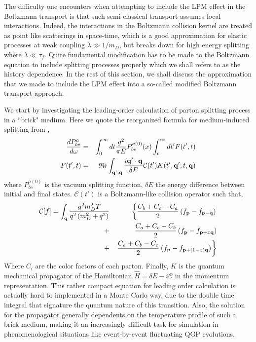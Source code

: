 \documentclass[aps, prc, reprint, amsmath, groupedaddress, nofootinbib]{revtex4-1}
\begin{document}
The difficulty one encounters when attempting to include the LPM effect in the Boltzmann transport is that such semi-classical transport assumes local interactions.
Indeed, the interactions in the Boltzmann collision kernel are treated as point like scatterings in space-time, which is a good approximation for elastic processes at weak coupling $\lambda \gg 1/m_D$, but breaks down for high energy splitting where $\lambda \ll \tau_f$.
Quite fundamental modification has to be made to the Boltzmann equation to include splitting processes properly which we shall refers to as the history dependence.
In the rest of this section, we shall discuss the approximation that we made to include the LPM effect into a so-called modified Boltzmann transport approach.

We start by investigating the leading-order calculation of parton splitting process in a ``brick" medium.
Here we quote the reorganized formula for medium-induced splitting from \cite{CaronHuot:2010bp},
\begin{eqnarray}
\frac{dP^{a}_{bc}}{d\omega} &=& \int_0^\infty dt \frac{g^2}{\pi E} P_{bc}^{a(0)}(x) \int_t^\infty dt'  F(t', t)\label{eq:LO-eq}\\
F(t', t) &=& \mathfrak{Re} \int_{{\bf q}', {\bf q}} \frac{i {\bf q}'\cdot {\bf q}}{\delta E} \mathcal{C}(t') K(t', {\bf q}'; t, {\bf q})
\end{eqnarray}
where $P_{bc}^{a(0)}$ is the vacuum splitting function, $\delta E$ the energy difference between initial and final states. $\mathcal{C}(t')$ is a Boltzmann-like collision operator such that,
\begin{eqnarray}
\mathcal{C}[f] = \int_{\bf q} \frac{g^2 m_D^2 T}{q^2\left(m_D^2+q^2\right)}
&&\left\{  \frac{C_b+C_c-C_a}{2}\left(f_{\bf p}-f_{{\bf p}-{\bf q}}\right) \right.\\\nonumber
 +&&    \frac{C_a+C_c-C_b}{2}\left(f_{\bf p}-f_{{\bf p}+x{\bf q}}\right) \\\nonumber
+&&  \left. \frac{C_a+C_b-C_c}{2}\left(f_{\bf p}-f_{{\bf p}+(1-x){\bf q}}\right)\right\}
\end{eqnarray}
Where $C_i$ are the color factors of each parton.
Finally, $K$ is the quantum mechanical propagator of the Hamiltonian $\hat{H} = \delta E - i\mathcal{C}$ in the momentum representation.
This rather compact equation for leading order calculation is actually hard to implemented in a Monte Carlo way, due to the double time integral that signature the quantum nature of this transition.
Also, the solution for the propagator generally dependents on the temperature profile of such a brick medium, making it an increasingly difficult task for simulation in phenomenological situations like event-by-event fluctuating QGP evolutions.
\end{document}
